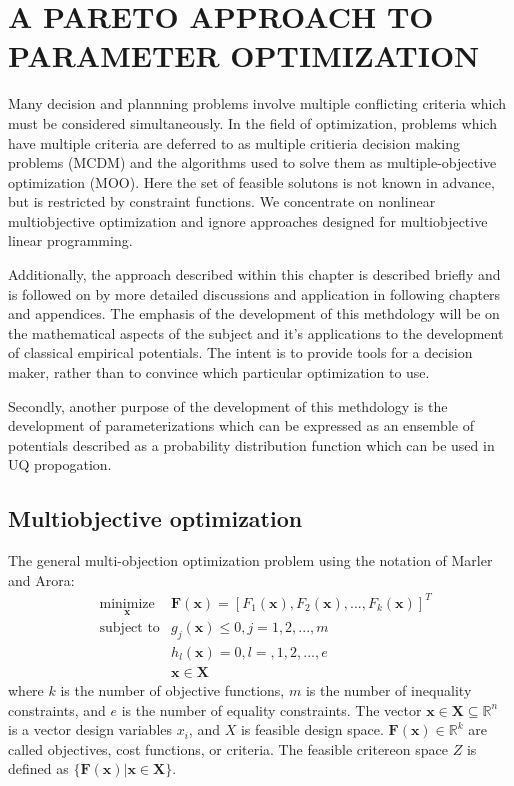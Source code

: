 \chapter{A PARETO APPROACH TO PARAMETER OPTIMIZATION}

Many decision and plannning problems involve multiple conflicting criteria which must be considered simultaneously.  In the field of optimization, problems which have multiple criteria are deferred to as multiple critieria decision making problems (MCDM) and the algorithms used to solve them as multiple-objective optimization (MOO).  Here the set of feasible solutons is not known in advance, but is restricted by constraint functions.  We concentrate on nonlinear multiobjective optimization and ignore approaches designed for multiobjective linear programming.

Additionally, the approach described within this chapter is described briefly and is followed on by more detailed discussions and application in following chapters and appendices.  The emphasis of the development of this methdology will be on the mathematical aspects of the subject and it's applications to the development of classical empirical potentials.  The intent is to provide tools for a decision maker, rather than to convince which particular optimization to use.

Secondly, another purpose of the development of this methdology is the development of parameterizations which can be expressed as an ensemble of potentials described as a probability distribution function which can be used in UQ propogation.

\section{Multiobjective optimization}

The general multi-objection optimization problem using the notation of Marler and Arora\cite{Marler2004_moo_survey}:
\begin{align}
  & \underset{\bm{x}}{\text{minimize}}
        &\bm{F}(\bm{x}) = [ F_1(\bm{x}),
                            F_2(\bm{x}),
                            ...,
                            F_k(\bm{x})]^T\\
  & \text{subject to}
        &g_j(\bm{x}) \leq 0, j=1,2,...,m \\
  &     &h_l(\bm{x}) = 0, l=,1,2,...,e \\
  &     &\bm{x} \in \bm{X}
\end{align}
where $k$ is the number of objective functions, $m$ is the number of inequality constraints, and $e$ is the number of equality constraints.
The vector $\bm{x} \in \bm{X} \subseteq \mathbb{R}^n$ is a vector design variables $x_i$, and $X$ is feasible design space.
$\bm{F}(\bm{x}) \in \mathbb{R}^k$
are called objectives, cost functions, or criteria.  The feasible critereon space $Z$ is defined as
$\{\bm{F}(\bm{x}) | \bm{x} \in \bm{X} \}$.

